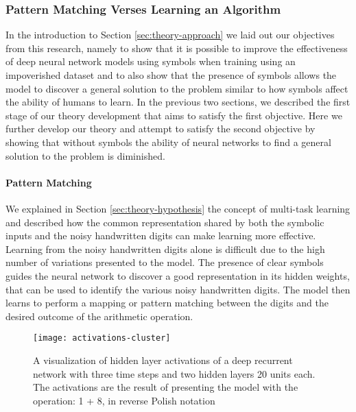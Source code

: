 \subsubsection{Pattern Matching Verses Learning an Algorithm} \label{sec:theory-approach-methodology-pattern-matching-vs-learning-an-algorithm}

In the introduction to Section \ref{sec:theory-approach} we laid out our objectives from this research, namely to show that it is possible to improve the effectiveness of deep neural network models using symbols when training using an impoverished dataset and to also show that the presence of symbols allows the model to discover a general solution to the problem similar to how symbols affect the ability of humans to learn. In the previous two sections, we described the first stage of our theory development that aims to satisfy the first objective. Here we further develop our theory and attempt to satisfy the second objective by showing that without symbols the ability of neural networks to find a general solution to the problem is diminished.

\paragraph{Pattern Matching}

We explained in Section \ref{sec:theory-hypothesis} the concept of multi-task learning and described how the common representation shared by both the symbolic inputs and the noisy handwritten digits can make learning more effective. Learning from the noisy handwritten digits alone is difficult due to the high number of variations presented to the model. The presence of clear symbols guides the neural network to discover a good representation in its hidden weights, that can be used to identify the various noisy handwritten digits. The model then learns to perform a mapping or pattern matching between the digits and the desired outcome of the arithmetic operation.

\begin{figure}[t]
	\centering
	\texttt{[image: activations-cluster]}
	\caption{A visualization of hidden layer activations of a deep recurrent network with three time steps and two hidden layers 20 units each. The activations are the result of presenting the model with the operation: 1 + 8, in reverse Polish notation}
	\label{fig:activations-cluster}
\end{figure} 

